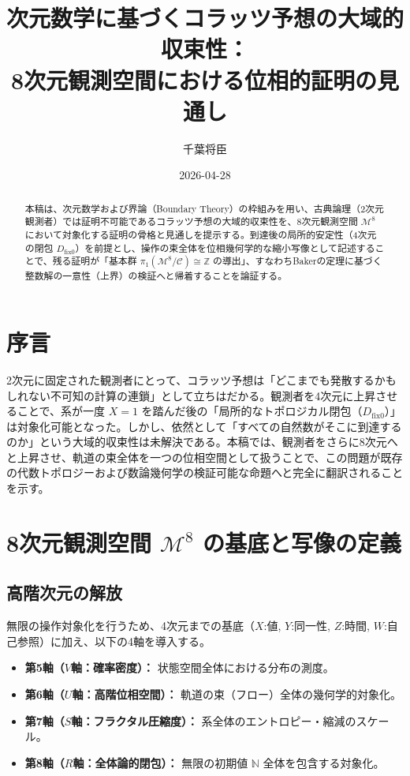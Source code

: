 \documentclass[11pt,a4paper]{article}
\newcommand{\dfix}{D_{\mathrm{fix}0}}
\theoremstyle{definition}
\begin{document}
\title{次元数学に基づくコラッツ予想の大域的収束性：\\8次元観測空間における位相的証明の見通し}
\author{千葉将臣}
\date{2026-04-28}
\maketitle

\begin{abstract}
本稿は、次元数学および界論（Boundary Theory）の枠組みを用い、古典論理（2次元観測者）では証明不可能であるコラッツ予想の大域的収束性を、8次元観測空間 $\mathcal{M}^8$ において対象化する証明の骨格と見通しを提示する。到達後の局所的安定性（4次元の閉包 $\dfix$）を前提とし、操作の束全体を位相幾何学的な縮小写像として記述することで、残る証明が「基本群 $\pi_1(\mathcal{M}^8 / \mathcal{C}) \cong \mathbb{Z}$ の導出」、すなわちBakerの定理に基づく整数解の一意性（上界）の検証へと帰着することを論証する。
\end{abstract}

\section*{序言}
2次元に固定された観測者にとって、コラッツ予想は「どこまでも発散するかもしれない不可知の計算の連鎖」として立ちはだかる。観測者を4次元に上昇させることで、系が一度 $X=1$ を踏んだ後の「局所的なトポロジカル閉包（$\dfix$）」は対象化可能となった。しかし、依然として「すべての自然数がそこに到達するのか」という大域的収束性は未解決である。本稿では、観測者をさらに8次元へと上昇させ、軌道の束全体を一つの位相空間として扱うことで、この問題が既存の代数トポロジーおよび数論幾何学の検証可能な命題へと完全に翻訳されることを示す。

\section{8次元観測空間 $\mathcal{M}^8$ の基底と写像の定義}

\subsection{高階次元の解放}
無限の操作対象化を行うため、4次元までの基底（$X$:値, $Y$:同一性, $Z$:時間, $W$:自己参照）に加え、以下の4軸を導入する。
\begin{itemize}
    \item \textbf{第5軸（$V$軸：確率密度）：} 状態空間全体における分布の測度。
    \item \textbf{第6軸（$U$軸：高階位相空間）：} 軌道の束（フロー）全体の幾何学的対象化。
    \item \textbf{第7軸（$S$軸：フラクタル圧縮度）：} 系全体のエントロピー・縮減のスケール。
    \item \textbf{第8軸（$R$軸：全体論的閉包）：} 無限の初期値 $\mathbb{N}$ 全体を包含する対象化。
\end{itemize}
\end{document}

